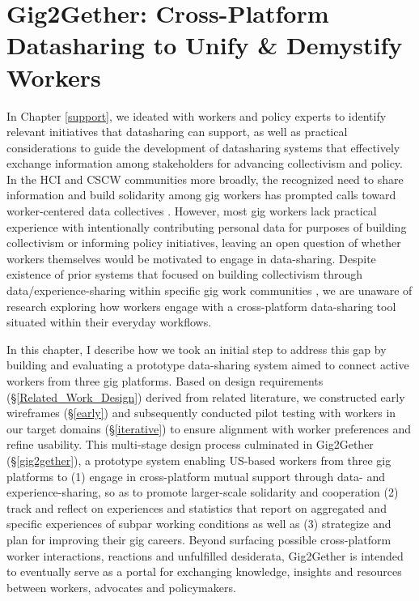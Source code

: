 \chapter{Gig2Gether: Cross-Platform Datasharing to Unify \& Demystify Workers} \label{6gig2gether}
In Chapter \ref{support}, we ideated with workers and policy experts to identify relevant initiatives that datasharing can support, as well as practical considerations to guide the development of datasharing systems that effectively exchange information among stakeholders for advancing collectivism and policy.
In the HCI and CSCW communities more broadly, the recognized need to share information and build solidarity among gig workers has prompted calls toward worker-centered data collectives \cite{supporting, workshop, end, uuapp, sousveillance}. 
However, most gig workers lack practical experience with intentionally contributing personal data for purposes of building collectivism or informing policy initiatives, leaving an open question of whether workers themselves would be motivated to engage in data-sharing. Despite existence of prior systems that focused on building collectivism through data/experience-sharing within specific gig work communities \cite{dynamo, 6B4U}, we are unaware of research exploring how workers engage with a cross-platform data-sharing tool situated within their everyday workflows.

{In this chapter, I describe how we took an initial step to address this gap by building and evaluating a prototype data-sharing system aimed to connect active workers from three gig platforms.
Based on design requirements {(\S\ref{Related_Work_Design})} derived from related literature, we constructed early wireframes {(\S\ref{early})} and subsequently
conducted pilot testing with workers in our target domains (\S\ref{iterative}) to ensure alignment with worker preferences and refine usability.}
{This multi-stage design process culminated in} Gig2Gether (\S\ref{gig2gether}), a {prototype} system {enabling} US-based workers {from three gig platforms} to (1) {engage in cross-platform mutual support through data- and experience-sharing, so as to promote larger-scale solidarity and cooperation} (2) track {and reflect on experiences and statistics that report on aggregated and specific experiences of subpar working conditions}
 as well as (3) {strategize and} plan {for improving their gig careers}. {Beyond} {surfacing possible cross-platform} worker {interactions, reactions and unfulfilled }desiderata, Gig2Gether is intended to eventually serve as a portal {for exchanging knowledge, insights and resources} between workers, advocates and policymakers.

